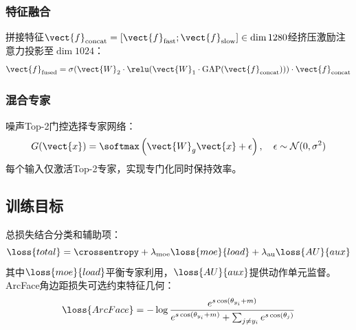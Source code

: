 \subsubsection{特征融合}

拼接特征$\vect{f}_{\text{concat}} = [\vect{f}_{\text{fast}}; \vect{f}_{\text{slow}}] \in \dim{1280}$经挤压激励注意力投影至$\dim{1024}$：
\begin{equation}
\vect{f}_{\text{fused}} = \sigma(\vect{W}_2 \cdot \relu(\vect{W}_1 \cdot \text{GAP}(\vect{f}_{\text{concat}}))) \cdot \vect{f}_{\text{concat}}
\end{equation}

\subsubsection{混合专家}

噪声Top-2门控选择专家网络：
\begin{equation}
G(\vect{x}) = \softmax\left( \vect{W}_g \vect{x} + \epsilon \right), \quad \epsilon \sim \mathcal{N}(0, \sigma^2)
\end{equation}
每个输入仅激活Top-2专家，实现专门化同时保持效率。

\subsection{训练目标}

总损失结合分类和辅助项：
\begin{equation}
\loss{total} = \crossentropy + \lambda_{\text{moe}} \loss{moe}{load} + \lambda_{\text{au}} \loss{AU}{aux}
\end{equation}
其中$\loss{moe}{load}$平衡专家利用，$\loss{AU}{aux}$提供动作单元监督。ArcFace角边距损失可选约束特征几何：
\begin{equation}
\loss{ArcFace} = -\log \frac{e^{s \cos(\theta_{y_i} + m)}}{e^{s \cos(\theta_{y_i} + m)} + \sum_{j \neq y_i} e^{s \cos(\theta_j)}}
\end{equation}